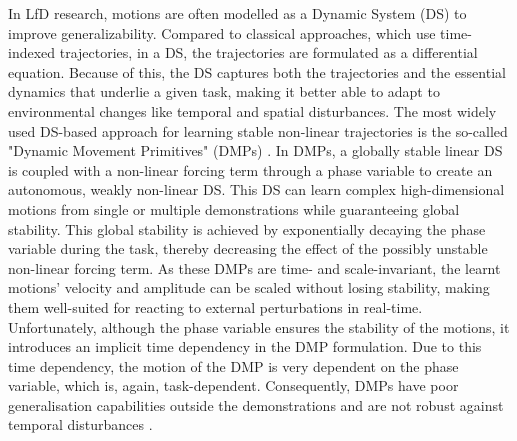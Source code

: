 In LfD research, motions are often modelled as a Dynamic System (DS) \cite{khansari-zadehLearningStableNonlinear2011} to improve generalizability. Compared to classical approaches, which use time-indexed trajectories, in a DS, the trajectories are formulated as a differential equation. Because of this, the DS captures both the trajectories and the essential dynamics that underlie a given task, making it better able to adapt to environmental changes like temporal and spatial disturbances. The most widely used DS-based approach for learning stable non-linear trajectories is the so-called "Dynamic Movement Primitives" (DMPs) \cite{ijspeertDynamicalMovementPrimitives2013,saverianoDynamicMovementPrimitives2021,wangLearningDemonstrationUsing2021,sidiropoulosReversibleDynamicMovement2021,ginesiOvercomingDrawbacksDynamic2021,rozanecNeuralDynamicMovement2022,liProDMPsUnifiedPerspective2022}. In DMPs, a globally stable linear DS is coupled with a non-linear forcing term through a phase variable to create an autonomous, weakly non-linear DS. This DS can learn complex high-dimensional motions from single \cite{ijspeertDynamicalMovementPrimitives2013,prakashDynamicTrajectoryGeneration2020} or multiple demonstrations \cite{matsubaraLearningParametricDynamic2011,pervezLearningTaskparameterizedDynamic2018} while guaranteeing global stability. This global stability is achieved by exponentially decaying the phase variable during the task, thereby decreasing the effect of the possibly unstable non-linear forcing term. As these DMPs are time- and scale-invariant, the learnt motions' velocity and amplitude can be scaled without losing stability, making them well-suited for reacting to external perturbations in real-time. Unfortunately, although the phase variable ensures the stability of the motions, it introduces an implicit time dependency in the DMP formulation. Due to this time dependency, the motion of the DMP is very dependent on the phase variable, which is, again, task-dependent. Consequently, DMPs have poor generalisation capabilities outside the demonstrations and are not robust against temporal disturbances \cite{neumannLearningRobotMotions2015}.




